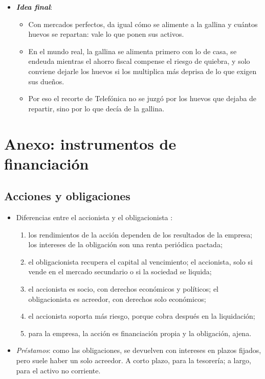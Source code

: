 \documentclass[11pt]{article}
\begin{document}
\begin{itemize}
\begin{itemize}
  \item Igualar el trato fiscal de la deuda y de los fondos propios y abrir el mercado a las pymes reduciría la fragilidad del exceso de deuda sin frenar la inversión.
  \end{itemize}
\item \textbf{\emph{Idea final}}:
  \begin{itemize}
  \item Con mercados perfectos, da igual cómo se alimente a la gallina y cuántos huevos se repartan: vale lo que ponen sus activos.

  \item En el mundo real, la gallina se alimenta primero con lo de casa, se endeuda mientras el ahorro fiscal compense el riesgo de quiebra, y solo conviene dejarle los huevos si los multiplica más deprisa de lo que exigen sus dueños.

  \item Por eso el recorte de Telefónica no se juzgó por los huevos que dejaba de repartir, sino por lo que decía de la gallina.
  \end{itemize}
\end{itemize}

\clearpage
\appendix

\section{Anexo: instrumentos de financiación}\label{anexo:instrumentos}

\subsection{Acciones y obligaciones}\label{anexo:acciones-obligaciones}

\begin{itemize}
\item Diferencias entre el accionista y el obligacionista  :
  \begin{enumerate}
  \item los rendimientos de la acción dependen de los resultados de la empresa; los intereses de la obligación son una renta periódica pactada;
  \item el obligacionista recupera el capital al vencimiento; el accionista, solo si vende en el mercado secundario o si la sociedad se liquida;
  \item el accionista es socio, con derechos económicos y políticos; el obligacionista es acreedor, con derechos solo económicos;
  \item el accionista soporta más riesgo, porque cobra después en la liquidación;
  \item para la empresa, la acción es financiación propia y la obligación, ajena.
  \end{enumerate}
\item \emph{Préstamos}: como las obligaciones, se devuelven con intereses en plazos fijados, pero suele haber un solo acreedor. A corto plazo, para la tesorería; a largo, para el activo no corriente.
\end{itemize}
\end{document}
